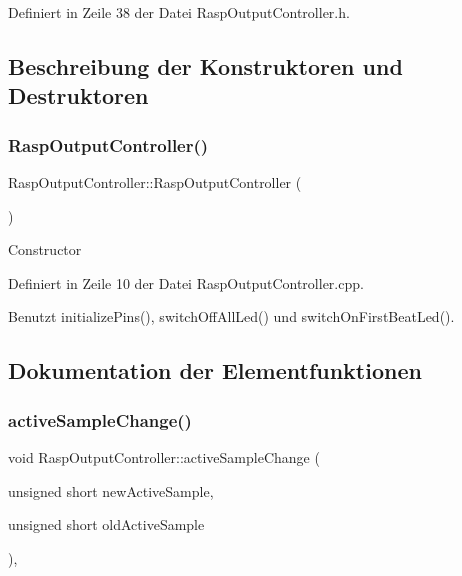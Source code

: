 Definiert in Zeile 38 der Datei Rasp\+Output\+Controller.\+h.



\subsection{Beschreibung der Konstruktoren und Destruktoren}
\mbox{\label{class_rasp_output_controller_afd7487de7ff81c6b092f4072d4fa80a5}} 
\subsubsection{\texorpdfstring{Rasp\+Output\+Controller()}{RaspOutputController()}}
{\footnotesize\ttfamily Rasp\+Output\+Controller\+::\+Rasp\+Output\+Controller (\begin{DoxyParamCaption}{ }\end{DoxyParamCaption})}

Constructor 

Definiert in Zeile 10 der Datei Rasp\+Output\+Controller.\+cpp.



Benutzt initialize\+Pins(), switch\+Off\+All\+Led() und switch\+On\+First\+Beat\+Led().



\subsection{Dokumentation der Elementfunktionen}
\mbox{\label{class_rasp_output_controller_a92954cf26d4dd5f7d8835d1d508302c0}} 
\subsubsection{\texorpdfstring{active\+Sample\+Change()}{activeSampleChange()}}
{\footnotesize\ttfamily void Rasp\+Output\+Controller\+::active\+Sample\+Change (\begin{DoxyParamCaption}\item[{unsigned short}]{new\+Active\+Sample,  }\item[{unsigned short}]{old\+Active\+Sample }\end{DoxyParamCaption})\hspace{0.3cm}{\ttfamily [override]}, {\ttfamily [virtual]}}

